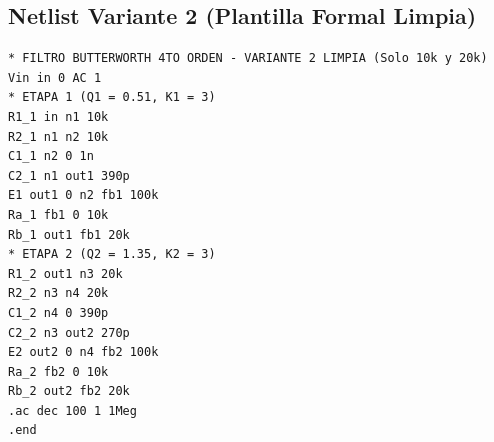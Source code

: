 \documentclass[a4paper,11pt]{article}
\begin{document}
\subsection{Netlist Variante 2 (Plantilla Formal Limpia)}
\begin{lstlisting}
* FILTRO BUTTERWORTH 4TO ORDEN - VARIANTE 2 LIMPIA (Solo 10k y 20k)
Vin in 0 AC 1
* ETAPA 1 (Q1 = 0.51, K1 = 3)
R1_1 in n1 10k
R2_1 n1 n2 10k
C1_1 n2 0 1n
C2_1 n1 out1 390p
E1 out1 0 n2 fb1 100k
Ra_1 fb1 0 10k
Rb_1 out1 fb1 20k
* ETAPA 2 (Q2 = 1.35, K2 = 3)
R1_2 out1 n3 20k
R2_2 n3 n4 20k
C1_2 n4 0 390p
C2_2 n3 out2 270p
E2 out2 0 n4 fb2 100k
Ra_2 fb2 0 10k
Rb_2 out2 fb2 20k
.ac dec 100 1 1Meg
.end
\end{lstlisting}
\end{document}
